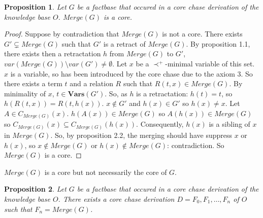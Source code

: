 \documentclass{article}
\newtheorem{proposition}{Proposition}[section]
\theoremstyle{definition}
\theoremstyle{remark}
\newcommand{\Vars}{\textbf{Vars}}
\newcommand{\Merge}{\textit{Merge}}
\begin{document}
\begin{proposition} 
Let $G$ be a factbase that occured in a core chase derivation of the knowledge base $O$. $\Merge(G)$ is a core.
\end{proposition}

\begin{proof}
Suppose by contradiction that $\Merge(G)$ is not a core. There exists $G' \subsetneq \Merge(G)$ such that $G'$ is a retract of $\Merge(G)$. By proposition 1.1, there exists then a retractation $h$ from $\Merge(G)$ to $G'$, $var(\Merge(G))\setminus var(G') \neq \emptyset$. Let $x$ be a $\prec^+$-minimal variable of this set. $x$ is a variable, so has been introduced by the core chase due to the axiom 3. So there exists a term $t$ and a relation $R$ such that $R(t,x) \in \Merge(G)$. By minimality of $x$, $t \in \Vars(G')$. So, as $h$ is a retractation: $h(t) = t$, so $h(R(t,x)) = R(t,h(x))$. $x \notin G'$ and $h(x) \in G'$ so $h(x) \neq x$. Let $A \in C_{\Merge(G)}(x)$. $h(A(x)) \in \Merge(G)$ so $A(h(x)) \in \Merge(G)$ so $C_{\Merge(G)}(x) \subseteq C_{\Merge(G)}(h(x))$. Consequently, $h(x)$ is a sibling of $x$ in $\Merge(G)$. So, by proposition 2.2, the merging should have suppress $x$ or $h(x)$, so $x \notin \Merge(G)$ or $h(x) \notin \Merge(G)$: contradiction. So $\Merge(G)$ is a core.
\end{proof}	

$\Merge(G)$ is a core but not necessarily the core of $G$.

\begin{proposition}
Let $G$ be a factbase that occured in a core chase derivation of the knowledge base $O$. There exists a core chase derivation $D = F_0,F_1,\ldots,F_n$ of $O$ such that $F_n = \Merge(G)$.
\end{proposition}
\end{document}
